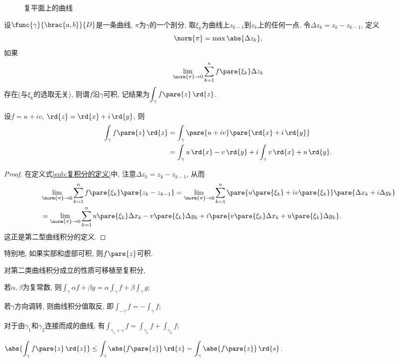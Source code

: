 \documentclass{ctexart}
\begin{document}
\begin{figure}[ht]
    \centering
    \caption{复平面上的曲线}
    \label{fig:复平面上的曲线}
\end{figure}
设$\func{\gamma}{\brac{a,b}}{D}$是一条曲线, $\pi$为$\gamma$的一个剖分, 取$\xi_k$为曲线上$z_{k-1}$到$z_k$上的任何一点. 令$\Delta z_k = z_k - z_{k-1}$, 定义
\[ \norm{\pi} = \max \abs{\Delta z_k}, \]
如果
\begin{equation}
    \label{eq:复积分的定义}
    \lim_{\norm{\pi}\rightarrow 0} \sum_{k=1}^n f\pare{\xi_k}\Delta z_k 
\end{equation}
存在(与$\xi_k$的选取无关), 则谓$f$沿$\gamma$可积, 记结果为$\displaystyle \int_\gamma f\pare{z}\,\rd{z}$.
\begin{proposition}
    设$f=u+iv$, $\rd{z} = \rd{x} + i\,\rd{y}$, 则
    \begin{align*}
        \int_\gamma f\pare{z}\,\rd{z} &= \int_\gamma \pare{u + iv}\pare{\rd{x} + i\,\rd{y}} \\
        &= \int_\gamma u\,\rd{x} - v\,\rd{y} + i\int_\gamma v\,\rd{x} + u\,\rd{y}.
    \end{align*}
\end{proposition}
\begin{proof}
    在定义式\eqref{sub:复积分的定义}中, 注意$\Delta z_k = z_k - z_{k-1}$, 从而
    \begin{align*}
        &\lim_{\norm{\pi}\rightarrow 0} \sum_{k=1}^n f\pare{\xi_k}\pare{z_k - z_{k-1}} = \lim_{\norm{\pi}\rightarrow 0}\sum_{k=1}^n \pare{u\pare{\xi_k} + iv\pare{\xi_k}}\pare{\Delta x_k + i\Delta y_k} \\
        &= \lim_{\norm{\pi}\rightarrow 0}\sum_{k=1}^n u\pare{\xi_k}\Delta x_k - v\pare{\xi_k}\Delta y_k + i\pare{v\pare{\xi_k}\Delta x_k + u\pare{\xi_k}\Delta y_k}.
    \end{align*}
    这正是第二型曲线积分的定义.
\end{proof}
特别地, 如果实部和虚部可积, 则$f\pare{z}$可积.
\begin{proposition}
    对第二类曲线积分成立的性质可移植至复积分,
    \begin{cenum}
        \item 若$\alpha,\beta$为复常数, 则$\displaystyle \int_\gamma \alpha f + \beta g = \alpha\int_\gamma f + \beta \int_\gamma g$;
        \item 若$\gamma$方向调转, 则曲线积分值取反, 即$\displaystyle \int_{-\gamma} f = - \int_\gamma f$;
        \item 对于由$\gamma_1$和$\gamma_2$连接而成的曲线, 有$\displaystyle \int_{\gamma_1 + \gamma} f = \int_{\gamma_1} f + \int_{\gamma_2} f$;
        \item $\displaystyle \abs{\int_\gamma f\pare{z}\,\rd{z}}\le \int_\gamma \abs{f\pare{z}}\,\rd{z} = \int_\gamma\abs{f\pare{z}}\,\rd{s}$.
    \end{cenum}
\end{proposition}
\end{document}
